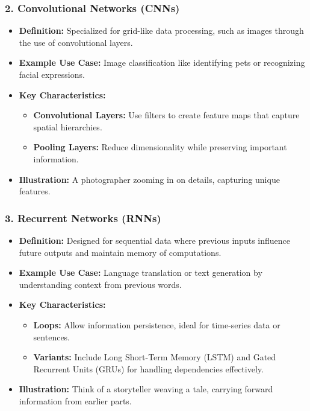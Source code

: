 \documentclass[aspectratio=169]{beamer}
\begin{document}
\begin{frame}[fragile]
    \frametitle{2. Convolutional Networks (CNNs)}
    \begin{itemize}
        \item \textbf{Definition:} Specialized for grid-like data processing, such as images through the use of convolutional layers.
        \item \textbf{Example Use Case:} Image classification like identifying pets or recognizing facial expressions.
        \item \textbf{Key Characteristics:}
        \begin{itemize}
            \item \textbf{Convolutional Layers:} Use filters to create feature maps that capture spatial hierarchies.
            \item \textbf{Pooling Layers:} Reduce dimensionality while preserving important information.
        \end{itemize}
        \item \textbf{Illustration:} A photographer zooming in on details, capturing unique features.
    \end{itemize}
\end{frame}

\begin{frame}[fragile]
    \frametitle{3. Recurrent Networks (RNNs)}
    \begin{itemize}
        \item \textbf{Definition:} Designed for sequential data where previous inputs influence future outputs and maintain memory of computations.
        \item \textbf{Example Use Case:} Language translation or text generation by understanding context from previous words.
        \item \textbf{Key Characteristics:}
        \begin{itemize}
            \item \textbf{Loops:} Allow information persistence, ideal for time-series data or sentences.
            \item \textbf{Variants:} Include Long Short-Term Memory (LSTM) and Gated Recurrent Units (GRUs) for handling dependencies effectively.
        \end{itemize}
        \item \textbf{Illustration:} Think of a storyteller weaving a tale, carrying forward information from earlier parts.
    \end{itemize}
\end{frame}
\end{document}
